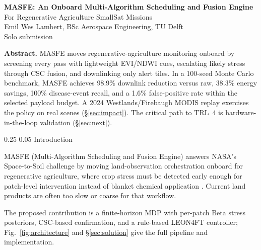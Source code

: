 \documentclass[11pt,letterpaper]{article}
\makeatletter
\renewcommand\section{\@startsection{section}{1}{\z@}
  {0.25\baselineskip}
  {0.05\baselineskip}
  {\normalfont\large\bfseries}}
\makeatother
\begin{document}
\thispagestyle{fancy}

\begin{center}
{\LARGE\bfseries MASFE: An Onboard Multi-Algorithm Scheduling and Fusion Engine}\\[2pt]
{\large For Regenerative Agriculture SmallSat Missions}\\[3pt]
Emil Wes Lambert, BSc Aerospace Engineering, TU Delft\\
Solo submission
\end{center}

\begingroup
\small
\textbf{Abstract.} MASFE moves regenerative-agriculture monitoring onboard by screening every pass with lightweight EVI/NDWI cues, escalating likely stress through CSC fusion, and downlinking only alert tiles. In a 100-seed Monte Carlo benchmark, MASFE achieves 98.9\% downlink reduction versus raw, 38.3\% energy savings, 100\% disease-event recall, and a 1.6\% false-positive rate within the selected payload budget. A 2024 Westlands/Firebaugh MODIS replay exercises the policy on real scenes (\S\ref{sec:impact}). The critical path to TRL~4 is hardware-in-the-loop validation (\S\ref{sec:next}).
\par
\endgroup

\section{Introduction}

MASFE (Multi-Algorithm Scheduling and Fusion Engine) answers NASA's Space-to-Soil challenge by moving land-observation orchestration onboard for regenerative agriculture, where crop stress must be detected early enough for patch-level intervention instead of blanket chemical application \cite{nasa-challenge-brief,gold-webinar1,mod13a1,mod11a1}. Current land products are often too slow or coarse for that workflow.

The proposed contribution is a finite-horizon MDP with per-patch Beta stress posteriors, CSC-based confirmation, and a rule-based LEON4FT controller; Fig.~\ref{fig:architecture} and \S\ref{sec:solution} give the full pipeline and implementation.
\end{document}
